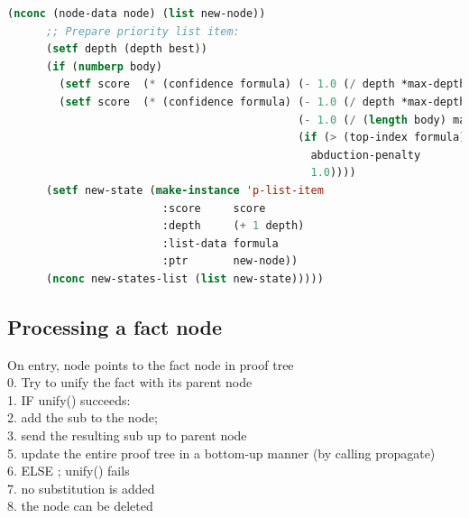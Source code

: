 \begin{lstlisting}[language=Lisp]
      (nconc (node-data node) (list new-node))
      ;; Prepare priority list item:
      (setf depth (depth best))
      (if (numberp body)
        (setf score  (* (confidence formula) (- 1.0 (/ depth *max-depth*))))
        (setf score  (* (confidence formula) (- 1.0 (/ depth *max-depth*))
                                             (- 1.0 (/ (length body) max-rule-length))
                                             (if (> (top-index formula) 0)
                                               abduction-penalty
                                               1.0))))
      (setf new-state (make-instance 'p-list-item
                        :score     score
                        :depth     (+ 1 depth)
                        :list-data formula
                        :ptr       new-node))
      (nconc new-states-list (list new-state)))))
\end{lstlisting}

\subsection{Processing a fact node}

On entry, node points to the fact node in proof tree\\
0. Try to unify the fact with its parent node\\
1. IF unify() succeeds:\\
2.     add the sub to the node;\\
3.     send the resulting sub up to parent node\\
5.     update the entire proof tree in a bottom-up manner (by calling propagate)\\
6. ELSE              ; unify() fails\\
7.     no substitution is added\\
8.     the node can be deleted

